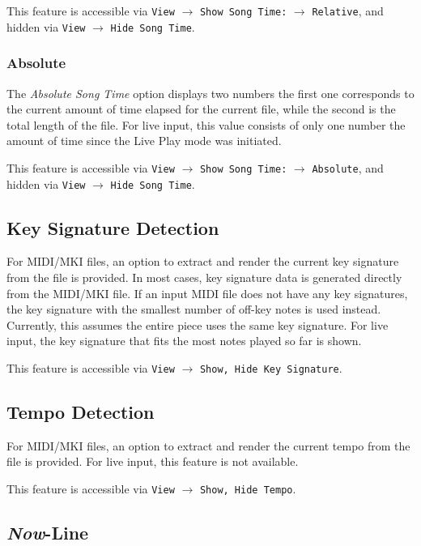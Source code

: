 \documentclass[english]{article}
\providecommand{\mi}[1]{\texttt{#1}}
\begin{document}
This feature is accessible via 
\mi{View} $\rightarrow$ \mi{Show Song Time:} $\rightarrow$ \mi{Relative}, and hidden via \mi{View} $\rightarrow$ \mi{Hide Song Time}.

\subsubsection{Absolute}

The \textit{Absolute Song Time} option displays two numbers \textendash{} the first one corresponds to the 
current amount of time elapsed for the current file, while the second is the total length of the file.
For live input, this value consists of only one number \textendash{}
the amount of time since the Live Play mode was initiated.

This feature is accessible via 
\mi{View} $\rightarrow$ \mi{Show Song Time:} $\rightarrow$ \mi{Absolute}, and hidden via \mi{View} $\rightarrow$ \mi{Hide Song Time}.

\subsection{Key Signature Detection}

For MIDI/MKI files, an option to extract and render the current key signature from the file is provided. In most cases,
key signature data is generated directly from the MIDI/MKI file.
If an input MIDI file does not have any key signatures, the key signature with the smallest number of off-key notes
is used instead. Currently, this assumes the entire piece uses the same key signature. 
For live input, the key signature that fits the most notes played so far is shown.

This feature is accessible via 
\mi{View} $\rightarrow$ \mi{{Show, Hide} Key Signature}.

\subsection{Tempo Detection}

For MIDI/MKI files, an option to extract and render the current tempo from the file is provided. For live input,
this feature is not available.

This feature is accessible via 
\mi{View} $\rightarrow$ \mi{{Show, Hide} Tempo}.

\subsection{\textit{Now}-Line}
\end{document}
